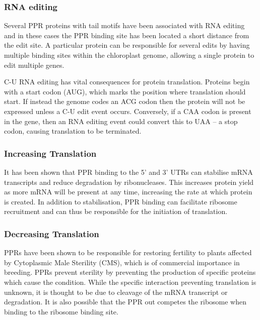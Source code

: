 \subsubsection{RNA editing}

Several PPR proteins with tail motifs have been associated with RNA editing and
in these cases the PPR binding site has been located a short distance from the
edit site\cite{Okuda2007,Yagi2013a}.
A particular protein can be responsible for several edits by having multiple
binding sites within the chloroplast genome\cite{Okuda2012}, allowing a single
protein to edit multiple genes.

C-U RNA editing has vital consequences for protein translation.
Proteins begin with a start codon (AUG), which marks the position where
translation should start.
If instead the genome codes an ACG codon then the protein will not be expressed
unless a C-U edit event occurs.
Conversely, if a CAA codon is present in the gene, then an RNA
editing event could convert this to UAA -- a stop codon, causing translation to
be terminated.

\subsubsection{Increasing Translation}

It has been shown that PPR binding to the 5' and 3' UTRs can stabilise mRNA
transcripts and reduce degradation by
ribonucleases\cite{Pfalz2009,Prikryl2011}.
This increases protein yield as more mRNA will be present at any time,
increasing the rate at which protein is created.
In addition to stabilisation, PPR binding can facilitate ribosome recruitment
and can thus be responsible for the initiation of translation.

\subsubsection{Decreasing Translation}

PPRs have been shown to be responsible for restoring fertility to plants
affected by Cytoplasmic Male Sterility (CMS)\cite{Bentolila2002}, which is of
commercial importance in breeding.
PPRs prevent sterility by preventing the production of specific proteins which
cause the condition\cite{Kazama2008}.
While the specific interaction preventing translation is unknown, it is thought
to be due to cleavage of the mRNA transcript or degradation\cite{Wang2006}.
It is also possible that the PPR out competes the ribosome when binding to the
ribosome binding site.

